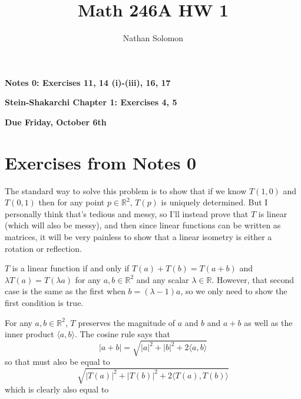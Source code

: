 \documentclass[12pt]{article}
\begin{document}
\title{Math 246A HW 1}
\author{Nathan Solomon}
\maketitle

\textbf{Notes 0: Exercises 11, 14 (i)-(iii), 16, 17}
\par
\textbf{Stein-Shakarchi Chapter 1: Exercises 4, 5}
\par
\textbf{Due Friday, October 6th}

\section{Exercises from Notes 0}

\bigskip
\noindent{}\bigskip

The standard way to solve this problem is to show that if we know $T(1,0)$ and $T(0, 1)$ then for any point $p \in \mathbb{R}^2$, $T(p)$ is uniquely determined. But I personally think that's tedious and messy, so I'll instead prove that $T$ is linear (which will also be messy), and then since linear functions can be written as matrices, it will be very painless to show that a linear isometry is either a rotation or reflection.
\par
$T$ is a linear function if and only if $T(a) + T(b) = T(a + b)$ and $\lambda T(a) = T(\lambda a)$ for any $a, b \in \mathbb{R}^2$ and any scalar $\lambda \in \mathbb{R}$. However, that second case is the same as the first when $b = (\lambda - 1) a$, so we only need to show the first condition is true.
\par
For any $a, b \in \mathbb{R}^2$, $T$ preserves the magnitude of $a$ and $b$ and $a+b$ as well as the inner product $\langle a, b \rangle$. The cosine rule says that
\[ |a+b| = \sqrt{|a|^2 + |b|^2 + 2 \langle a, b \rangle} \]
so that must also be equal to
\[ \sqrt{|T(a)|^2 + |T(b)|^2 + 2 \langle T(a), T(b) \rangle} \]
which is clearly also equal to
\end{document}
